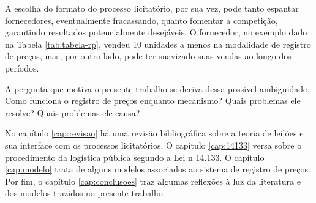 A escolha do formato do processo licitatório, por sua vez, pode tanto espantar fornecedores, eventualmente fracassando, quanto fomentar a competição, garantindo resultados potencialmente desejáveis. O fornecedor, no exemplo dado na Tabela \ref{tab:tabela-rp}, vendeu 10 unidades a menos na modalidade de registro de preços, mas, por outro lado, pode ter suavizado suas vendas ao longo dos períodos.

A pergunta que motiva o presente trabalho se deriva dessa possível ambiguidade. Como funciona o registro de preços enquanto mecanismo? Quais problemas ele resolve? Quais problemas ele causa?

No capítulo \ref{cap:revisao} há uma revisão bibliográfica sobre a teoria de leilões e sua interface com os processos licitatórios. O capítulo \ref{cap:14133} versa sobre o procedimento da logística pública segundo a Lei n{\textordmasculine } 14.133. O capítulo \ref{cap:modelo} trata de alguns modelos associados ao sistema de registro de preços. Por fim, o capítulo \ref{cap:conclusoes} traz algumas reflexões à luz da literatura e dos modelos trazidos no presente trabalho.